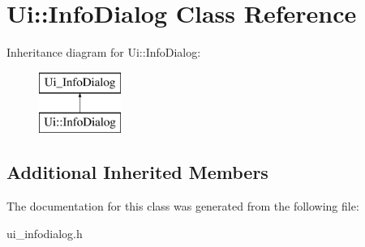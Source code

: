 \hypertarget{classUi_1_1InfoDialog}{\section{Ui\-:\-:Info\-Dialog Class Reference}
\label{classUi_1_1InfoDialog}
}
Inheritance diagram for Ui\-:\-:Info\-Dialog\-:\begin{figure}[H]
\begin{center}
\leavevmode
\includegraphics[height=2.000000cm]{classUi_1_1InfoDialog}
\end{center}
\end{figure}
\subsection*{Additional Inherited Members}


The documentation for this class was generated from the following file\-:\begin{DoxyCompactItemize}
\item 
ui\-\_\-infodialog.\-h\end{DoxyCompactItemize}
